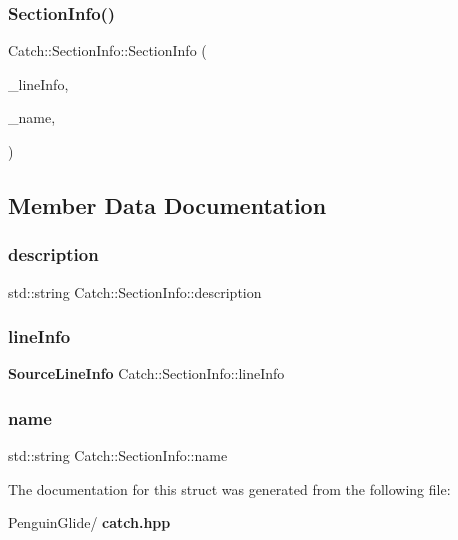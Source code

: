 \mbox{\label{struct_catch_1_1_section_info_a139875f2e7bd12a5898a948f8bad15b3}} 
\subsubsection{SectionInfo()\hspace{0.1cm}{\footnotesize\ttfamily [2/2]}}
{\footnotesize\ttfamily Catch\+::\+Section\+Info\+::\+Section\+Info (\begin{DoxyParamCaption}\item[{\textbf{ Source\+Line\+Info} const \&}]{\+\_\+line\+Info,  }\item[{std\+::string const \&}]{\+\_\+name,  }\item[{std\+::string const \&}]{ }\end{DoxyParamCaption})\hspace{0.3cm}{\ttfamily [inline]}}



\subsection{Member Data Documentation}
\mbox{\label{struct_catch_1_1_section_info_a0052060219a6de74bb7ade34d4163a4e}} 
\subsubsection{description}
{\footnotesize\ttfamily std\+::string Catch\+::\+Section\+Info\+::description}

\mbox{\label{struct_catch_1_1_section_info_adbc83b8a3507c4acc8ee249e93465711}} 
\subsubsection{lineInfo}
{\footnotesize\ttfamily \textbf{ Source\+Line\+Info} Catch\+::\+Section\+Info\+::line\+Info}

\mbox{\label{struct_catch_1_1_section_info_a704c8fc662d309137e0d4f199cb7df58}} 
\subsubsection{name}
{\footnotesize\ttfamily std\+::string Catch\+::\+Section\+Info\+::name}



The documentation for this struct was generated from the following file\+:\begin{DoxyCompactItemize}
\item 
Penguin\+Glide/\textbf{ catch.\+hpp}\end{DoxyCompactItemize}
